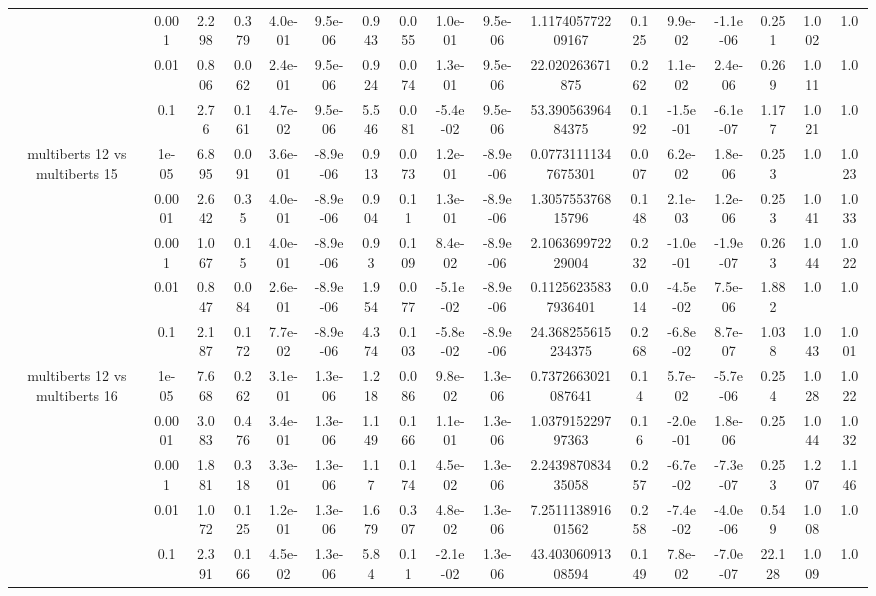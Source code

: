 \begin{tabular}{|c|c|c|c|c|c|c|c|c|c|c|c|c|c|c|c|c|}
 & 0.001 & 2.298 & 0.379 & 4.0e-01 & 9.5e-06 & 0.943 & 0.055 & 1.0e-01 & 9.5e-06 & 1.117405772209167 & 0.125 & 9.9e-02 & -1.1e-06 & 0.251 & 1.002 & 1.0 \\
 & 0.01 & 0.806 & 0.062 & 2.4e-01 & 9.5e-06 & 0.924 & 0.074 & 1.3e-01 & 9.5e-06 & 22.020263671875 & 0.262 & 1.1e-02 & 2.4e-06 & 0.269 & 1.011 & 1.0 \\
 & 0.1 & 2.76 & 0.161 & 4.7e-02 & 9.5e-06 & 5.546 & 0.081 & -5.4e-02 & 9.5e-06 & 53.39056396484375 & 0.192 & -1.5e-01 & -6.1e-07 & 1.177 & 1.021 & 1.0 \\
\hline
\multirow{5}{*}{multiberts 12 vs multiberts 15} & 1e-05 & 6.895 & 0.091 & 3.6e-01 & -8.9e-06 & 0.913 & 0.073 & 1.2e-01 & -8.9e-06 & 0.07731111347675301 & 0.007 & 6.2e-02 & 1.8e-06 & 0.253 & 1.0 & 1.023 \\
 & 0.0001 & 2.642 & 0.35 & 4.0e-01 & -8.9e-06 & 0.904 & 0.11 & 1.3e-01 & -8.9e-06 & 1.305755376815796 & 0.148 & 2.1e-03 & 1.2e-06 & 0.253 & 1.041 & 1.033 \\
 & 0.001 & 1.067 & 0.15 & 4.0e-01 & -8.9e-06 & 0.93 & 0.109 & 8.4e-02 & -8.9e-06 & 2.106369972229004 & 0.232 & -1.0e-01 & -1.9e-07 & 0.263 & 1.044 & 1.022 \\
 & 0.01 & 0.847 & 0.084 & 2.6e-01 & -8.9e-06 & 1.954 & 0.077 & -5.1e-02 & -8.9e-06 & 0.11256235837936401 & 0.014 & -4.5e-02 & 7.5e-06 & 1.882 & 1.0 & 1.0 \\
 & 0.1 & 2.187 & 0.172 & 7.7e-02 & -8.9e-06 & 4.374 & 0.103 & -5.8e-02 & -8.9e-06 & 24.368255615234375 & 0.268 & -6.8e-02 & 8.7e-07 & 1.038 & 1.043 & 1.001 \\
\hline
\multirow{5}{*}{multiberts 12 vs multiberts 16} & 1e-05 & 7.668 & 0.262 & 3.1e-01 & 1.3e-06 & 1.218 & 0.086 & 9.8e-02 & 1.3e-06 & 0.7372663021087641 & 0.14 & 5.7e-02 & -5.7e-06 & 0.254 & 1.028 & 1.022 \\
 & 0.0001 & 3.083 & 0.476 & 3.4e-01 & 1.3e-06 & 1.149 & 0.166 & 1.1e-01 & 1.3e-06 & 1.037915229797363 & 0.16 & -2.0e-01 & 1.8e-06 & 0.25 & 1.044 & 1.032 \\
 & 0.001 & 1.881 & 0.318 & 3.3e-01 & 1.3e-06 & 1.17 & 0.174 & 4.5e-02 & 1.3e-06 & 2.243987083435058 & 0.257 & -6.7e-02 & -7.3e-07 & 0.253 & 1.207 & 1.146 \\
 & 0.01 & 1.072 & 0.125 & 1.2e-01 & 1.3e-06 & 1.679 & 0.307 & 4.8e-02 & 1.3e-06 & 7.251113891601562 & 0.258 & -7.4e-02 & -4.0e-06 & 0.549 & 1.008 & 1.0 \\
 & 0.1 & 2.391 & 0.166 & 4.5e-02 & 1.3e-06 & 5.84 & 0.11 & -2.1e-02 & 1.3e-06 & 43.40306091308594 & 0.149 & 7.8e-02 & -7.0e-07 & 22.128 & 1.009 & 1.0 \\

\end{tabular}
